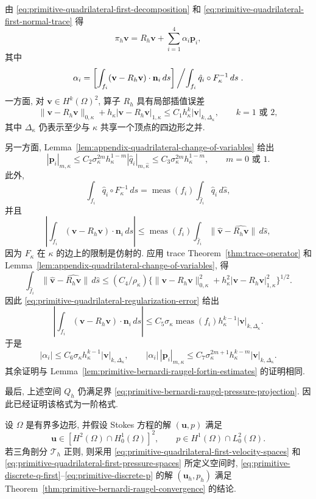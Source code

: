 \begin{Proof}
由 \eqref{eq:primitive-quadrilateral-first-decomposition} 和
\eqref{eq:primitive-quadrilateral-first-normal-trace} 得
\[
\pi_h\mathbf v=R_h\mathbf v+\sum_{i=1}^{4}\alpha_i\mathbf p_i,
\]
其中
\[
\alpha_i=
\left[\int_{f_i}(\mathbf v-R_h\mathbf v)\cdot\mathbf n_i\,ds\right]
\left/\int_{f_i}\hat q_i\circ F_\kappa^{-1}\,ds\right. .
\]
一方面, 对 $\mathbf v\in H^k(\Omega)^2$, 算子 $R_h$ 具有局部插值误差
\begin{equation}\label{eq:primitive-quadrilateral-regularization-error}
\|\mathbf v-R_h\mathbf v\|_{0,\kappa}
+h_\kappa|\mathbf v-R_h\mathbf v|_{1,\kappa}
\leq C_1h_\kappa^k|\mathbf v|_{k,\Delta_\kappa},
\qquad k=1\text{ 或 }2,
\end{equation}
其中 $\Delta_\kappa$ 仍表示至少与 $\kappa$ 共享一个顶点的四边形之并.

另一方面, Lemma~\ref{lem:appendix-quadrilateral-change-of-variables} 给出
\[
|\mathbf p_i|_{m,\kappa}
\leq C_2\sigma_\kappa^{2m}h_\kappa^{1-m}|\hat q_i|_{m,\hat\kappa}
\leq C_3\sigma_\kappa^{2m}h_\kappa^{1-m},
\qquad m=0\text{ 或 }1.
\]
此外,
\[
\int_{f_i}\hat q_i\circ F_\kappa^{-1}\,ds
=\operatorname{meas}(f_i)\int_{\hat f_i}\hat q_i\,d\hat s,
\]
并且
\[
\left|\int_{f_i}(\mathbf v-R_h\mathbf v)\cdot\mathbf n_i\,ds\right|
\leq\operatorname{meas}(f_i)
\int_{\hat f_i}\|\hat{\mathbf v}-\widehat{R_h\mathbf v}\|\,d\hat s,
\]
因为 $F_\kappa$ 在 $\kappa$ 的边上的限制是仿射的. 应用 trace
Theorem~\ref{thm:trace-operator} 和
Lemma~\ref{lem:appendix-quadrilateral-change-of-variables}, 得
\[
\int_{\hat f_i}\|\hat{\mathbf v}-\widehat{R_h\mathbf v}\|\,d\hat s
\leq(C_4/\rho_\kappa)
\{\|\mathbf v-R_h\mathbf v\|_{0,\kappa}^2
+h_\kappa^2|\mathbf v-R_h\mathbf v|_{1,\kappa}^2\}^{1/2}.
\]
因此 \eqref{eq:primitive-quadrilateral-regularization-error} 给出
\[
\left|\int_{f_i}(\mathbf v-R_h\mathbf v)\cdot\mathbf n_i\,ds\right|
\leq C_5\sigma_\kappa\operatorname{meas}(f_i)
h_\kappa^{k-1}|\mathbf v|_{k,\Delta_\kappa}.
\]
于是
\[
|\alpha_i|\leq C_6\sigma_\kappa h_\kappa^{k-1}|\mathbf v|_{k,\Delta_\kappa},
\qquad
|\alpha_i|\,|\mathbf p_i|_{m,\kappa}
\leq C_7\sigma_\kappa^{2m+1}h_\kappa^{k-m}|\mathbf v|_{k,\Delta_\kappa}.
\]
其余证明与 Lemma~\ref{lem:primitive-bernardi-raugel-fortin-estimates}
的证明相同.
\end{Proof}

最后, 上述空间 $Q_h$ 仍满足界 \eqref{eq:primitive-bernardi-raugel-pressure-projection}.
因此已经证明该格式为一阶格式.

\setcounter{statement}{0}
\renewcommand{\theHstatement}{theorem.\thesection.\arabic{statement}}
\begin{Theorem}\label{thm:primitive-quadrilateral-first-convergence}
设 $\Omega$ 是有界多边形, 并假设 Stokes 方程的解 $(\mathbf u,p)$ 满足
\[
\mathbf u\in[H^2(\Omega)\cap H_0^1(\Omega)]^2,
\qquad p\in H^1(\Omega)\cap L_0^2(\Omega).
\]
若三角剖分 $\mathcal T_h$ 正则, 则采用
\eqref{eq:primitive-quadrilateral-first-velocity-spaces} 和
\eqref{eq:primitive-quadrilateral-first-pressure-spaces} 所定义空间时,
\eqref{eq:primitive-discrete-q-first}--\eqref{eq:primitive-discrete-p}
的解 $(\mathbf u_h,p_h)$ 满足 Theorem~\ref{thm:primitive-bernardi-raugel-convergence}
的结论.
\end{Theorem}

